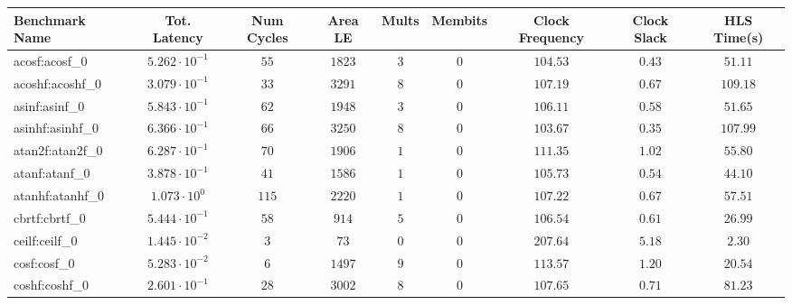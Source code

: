 \begin{tabular}{|l|c|c|c|c|c|c|c|c|}
\hline
Benchmark Name               & Tot. Latency            & Num Cycles & Area LE   & Mults   & Membits    & Clock Frequency & Clock Slack & HLS Time(s) \\
\hline
acosf:acosf\_0               & $ 5.262 \cdot 10^{-1} $ & $ 55     $ & $ 1823  $ & $ 3   $ & $ 0      $ & $ 104.53      $ & $ 0.43    $ & $ 51.11   $ \\
acoshf:acoshf\_0             & $ 3.079 \cdot 10^{-1} $ & $ 33     $ & $ 3291  $ & $ 8   $ & $ 0      $ & $ 107.19      $ & $ 0.67    $ & $ 109.18  $ \\
asinf:asinf\_0               & $ 5.843 \cdot 10^{-1} $ & $ 62     $ & $ 1948  $ & $ 3   $ & $ 0      $ & $ 106.11      $ & $ 0.58    $ & $ 51.65   $ \\
asinhf:asinhf\_0             & $ 6.366 \cdot 10^{-1} $ & $ 66     $ & $ 3250  $ & $ 8   $ & $ 0      $ & $ 103.67      $ & $ 0.35    $ & $ 107.99  $ \\
atan2f:atan2f\_0             & $ 6.287 \cdot 10^{-1} $ & $ 70     $ & $ 1906  $ & $ 1   $ & $ 0      $ & $ 111.35      $ & $ 1.02    $ & $ 55.80   $ \\
atanf:atanf\_0               & $ 3.878 \cdot 10^{-1} $ & $ 41     $ & $ 1586  $ & $ 1   $ & $ 0      $ & $ 105.73      $ & $ 0.54    $ & $ 44.10   $ \\
atanhf:atanhf\_0             & $ 1.073 \cdot 10^{0}  $ & $ 115    $ & $ 2220  $ & $ 1   $ & $ 0      $ & $ 107.22      $ & $ 0.67    $ & $ 57.51   $ \\
cbrtf:cbrtf\_0               & $ 5.444 \cdot 10^{-1} $ & $ 58     $ & $ 914   $ & $ 5   $ & $ 0      $ & $ 106.54      $ & $ 0.61    $ & $ 26.99   $ \\
ceilf:ceilf\_0               & $ 1.445 \cdot 10^{-2} $ & $ 3      $ & $ 73    $ & $ 0   $ & $ 0      $ & $ 207.64      $ & $ 5.18    $ & $ 2.30    $ \\
cosf:cosf\_0                 & $ 5.283 \cdot 10^{-2} $ & $ 6      $ & $ 1497  $ & $ 9   $ & $ 0      $ & $ 113.57      $ & $ 1.20    $ & $ 20.54   $ \\
coshf:coshf\_0               & $ 2.601 \cdot 10^{-1} $ & $ 28     $ & $ 3002  $ & $ 8   $ & $ 0      $ & $ 107.65      $ & $ 0.71    $ & $ 81.23   $ \\

\end{tabular}
